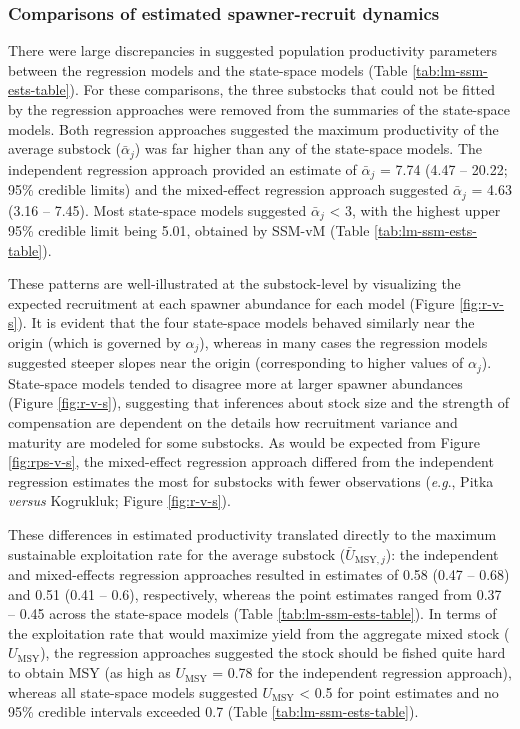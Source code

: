 \documentclass[12pt,]{book}
\theoremstyle{definition}
\theoremstyle{definition}
\theoremstyle{definition}
\theoremstyle{remark}
\begin{document}
\subsubsection{Comparisons of estimated spawner-recruit
dynamics}\label{comparisons-of-estimated-spawner-recruit-dynamics}

\noindent
There were large discrepancies in suggested population productivity
parameters between the regression models and the state-space models
(Table \ref{tab:lm-ssm-ests-table}). For these comparisons, the three
substocks that could not be fitted by the regression approaches were
removed from the summaries of the state-space models. Both regression
approaches suggested the maximum productivity of the average substock
(\(\bar{\alpha}_j\)) was far higher than any of the state-space models.
The independent regression approach provided an estimate of
\(\bar{\alpha}_j\) = 7.74 (4.47 -- 20.22; 95\% credible limits) and the
mixed-effect regression approach suggested \(\bar{\alpha}_j\) = 4.63
(3.16 -- 7.45). Most state-space models suggested \(\bar{\alpha}_j\)
\textless{} 3, with the highest upper 95\% credible limit being 5.01,
obtained by SSM-vM (Table \ref{tab:lm-ssm-ests-table}).

These patterns are well-illustrated at the substock-level by visualizing
the expected recruitment at each spawner abundance for each model
(Figure \ref{fig:r-v-s}). It is evident that the four state-space models
behaved similarly near the origin (which is governed by \(\alpha_j\)),
whereas in many cases the regression models suggested steeper slopes
near the origin (corresponding to higher values of \(\alpha_j\)).
State-space models tended to disagree more at larger spawner abundances
(Figure \ref{fig:r-v-s}), suggesting that inferences about stock size
and the strength of compensation are dependent on the details how
recruitment variance and maturity are modeled for some substocks. As
would be expected from Figure \ref{fig:rps-v-s}, the mixed-effect
regression approach differed from the independent regression estimates
the most for substocks with fewer observations (\emph{e}.\emph{g}.,
Pitka \emph{versus} Kogrukluk; Figure \ref{fig:r-v-s}).

These differences in estimated productivity translated directly to the
maximum sustainable exploitation rate for the average substock
(\(\bar{U}_{\text{MSY},j}\)): the independent and mixed-effects
regression approaches resulted in estimates of 0.58 (0.47 -- 0.68) and
0.51 (0.41 -- 0.6), respectively, whereas the point estimates ranged
from 0.37 -- 0.45 across the state-space models (Table
\ref{tab:lm-ssm-ests-table}). In terms of the exploitation rate that
would maximize yield from the aggregate mixed stock
(\(U_{\text{MSY}}\)), the regression approaches suggested the stock
should be fished quite hard to obtain MSY (as high as \(U_{\text{MSY}}\)
= 0.78 for the independent regression approach), whereas all state-space
models suggested \(U_{\text{MSY}}\) \textless{} 0.5 for point estimates
and no 95\% credible intervals exceeded 0.7 (Table
\ref{tab:lm-ssm-ests-table}).
\end{document}

